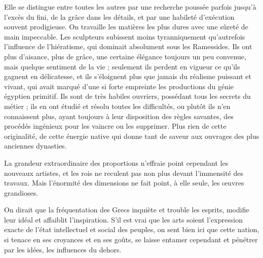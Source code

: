 \documentclass[a4paper, 11pt, oneside]{article}
\begin{document}
Elle se distingue entre toutes les autres par une recherche poussée parfois jusqu'à l'excès du fini, de la grâce dans les détails, et par une habileté d'exécution souvent prodigieuse. On travaille les matières les plus dures avec une sûreté de main impeccable. Les sculpteurs subissent moins tyranniquement qu'autrefois l'influence de l'hiératisme, qui dominait absolument sous les Ramessides. Ils ont plus d'aisance, plus de grâce, une certaine élégance toujours un peu convenue, mais quelque sentiment de la vie ; seulement ils perdent en vigueur ce qu'ils gagnent en délicatesse, et ils s'éloignent plus que jamais du réalisme puissant et vivant, qui avait marqué d'une si forte empreinte les productions du génie égyptien primitif. Ils sont de très habiles ouvriers, possédant tous les secrets du métier ; ils en ont étudié et résolu toutes les difficultés, ou plutôt ils n'en connaissent plus, ayant toujours à leur disposition des règles savantes, des procédés ingénieux pour les vaincre ou les supprimer. Plus rien de cette originalité, de cette énergie native qui donne tant de saveur aux ouvrages des plus anciennes dynasties.

La grandeur extraordinaire des proportions n'effraie point cependant les nouveaux artistes, et les rois ne reculent pas non plus devant l'immensité des travaux. Mais l'énormité des dimensions ne fait point, à elle seule, les œuvres grandioses.

On dirait que la fréquentation des Grecs inquiète et trouble les esprits, modifie leur idéal et affaiblit l'inspiration. S'il est vrai que les arts soient l'expression exacte de l'état intellectuel et social des peuples, on sent bien ici que cette nation, si tenace en ses croyances et en ses goûts, se laisse entamer cependant et pénétrer par les idées, les influences du dehors.
\end{document}
